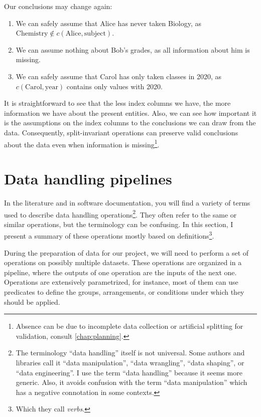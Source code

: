 Our conclusions may change again:
\begin{enumerate}
  \itemsep0em
  \item We can safely assume that Alice has never taken Biology, as $\text{Chemistry}
    \not\in c(\text{Alice}, \text{subject})$.
  \item We can assume nothing about Bob's grades, as all information about him is missing.
  \item We can safely assume that Carol has only taken classes in 2020, as $c(\text{Carol},
    \text{year})$ contains only values with 2020.
\end{enumerate}

It is straightforward to see that the less index columns we have, the more information we
have about the present entities.  Also, we can see how important it is the assumptions on
the index columns to the conclusions we can draw from the data.  Consequently,
split-invariant operations can preserve valid conclusions about the data even when
information is missing\footnote{Absence can be due to incomplete data collection or
artificial splitting for validation, consult \cref{chap:planning}.}.

\section{Data handling pipelines}

In the literature and in software documentation, you will find a variety of terms used to
describe data handling operations\footnote{%
  The terminology ``data handling'' itself is not universal.  Some authors and libraries
  call it ``data manipulation'', ``data wrangling'', ``data shaping'', or ``data
  engineering''.  I use the term ``data handling'' because it seems more generic.
  Also, it avoids confusion with the term ``data
  manipulation'' which has a negative connotation in some contexts.}. %
They often refer to the same or similar operations, but the terminology can be confusing.
In this section, I present a summary of these operations mostly based on
\textcite{Wickham2023} definitions\footnote{Which they call \emph{verbs}.}.


During the preparation of data for our project, we will need to perform a set of operations
on possibly multiple datasets.  These operations are organized in a pipeline, where the
outputs of one operation are the inputs of the next one.
Operations are extensively parametrized, for instance, most of them can use predicates to
define the groups, arrangements, or conditions under which they should be applied.

